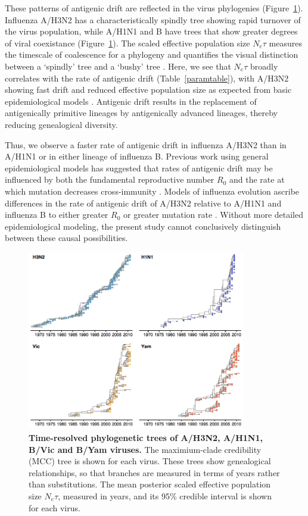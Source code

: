 \documentclass[11pt,oneside,letterpaper]{article}
\begin{document}
These patterns of antigenic drift are reflected in the virus phylogenies (Figure~\ref{trees}).
Influenza A/H3N2 has a characteristically spindly tree showing rapid turnover of the virus population, while A/H1N1 and B have trees that show greater degrees of viral coexistance (Figure~\ref{trees}).
The scaled effective population size $N_e \tau$ measures the timescale of coalescence for a phylogeny and quantifies the visual distinction between a `spindly' tree and a `bushy' tree \cite{Bedford11}.
Here, we see that $N_e \tau$ broadly correlates with the rate of antigenic drift (Table~\ref{paramtable}), with A/H3N2 showing fast drift and reduced effective population size as expected from basic epidemiological models \cite{Bedford12}.
Antigenic drift results in the replacement of antigenically primitive lineages by antigenically advanced lineages, thereby reducing genealogical diversity.

Thus, we observe a faster rate of antigenic drift in influenza A/H3N2 than in A/H1N1 or in either lineage of influenza B.
Previous work using general epidemiological models has suggested that rates of antigenic drift may be influenced by both the fundamental reproductive number $R_0$ and the rate at which mutation decreases cross-immunity \cite{Gog02,Lin03}.
Models of influenza evolution ascribe differences in the rate of antigenic drift of A/H3N2 relative to A/H1N1 and influenza B to either greater $R_0$ or greater mutation rate \cite{Ferguson03,Bedford12}.
Without more detailed epidemiological modeling, the present study cannot conclusively distinguish between these causal possibilities.

\begin{figure}[h]
	\centering		
	\includegraphics[width=0.85\textwidth]{figures/trees}
	\caption{\textbf{Time-resolved phylogenetic trees of A/H3N2, A/H1N1, B/Vic and B/Yam viruses.} 
	The maximium-clade credibility (MCC) tree is shown for each virus.
	These trees show genealogical relationships, so that branches are measured in terms of years rather than substitutions.
	The mean posterior scaled effective population size $N_e \tau$, measured in years, and its 95\% credible interval is shown for each virus.} 
	\label{trees} 
\end{figure}
\end{document}
